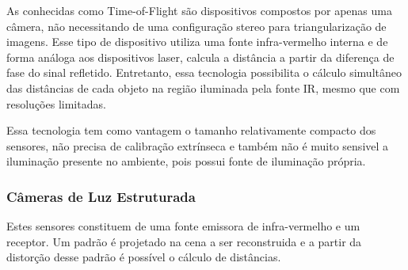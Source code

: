 As conhecidas como Time-of-Flight são dispositivos compostos por apenas uma
câmera, não necessitando de uma configuração stereo para triangularização de
imagens. Esse tipo de dispositivo utiliza uma fonte infra-vermelho interna e de
forma análoga aos dispositivos laser, calcula a distância a partir da diferença
de fase do sinal refletido. Entretanto, essa tecnologia possibilita o cálculo
simultâneo das distâncias de cada objeto na região iluminada pela fonte IR,
mesmo que com resoluções limitadas.


Essa tecnologia tem como vantagem o tamanho relativamente compacto dos sensores,
não precisa de calibração extrínseca e também não é muito sensivel a iluminação
presente no ambiente, pois possui fonte de iluminação própria.


\subsubsection{Câmeras de Luz Estruturada}

Estes sensores constituem de uma fonte emissora de infra-vermelho e um receptor.
Um padrão é projetado na cena a ser reconstruida e a partir da distorção desse
padrão é possível o cálculo de distâncias. 




